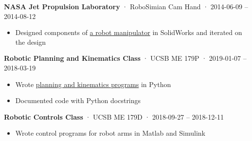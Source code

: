 \documentclass[12pt, oneside]{article}
\newcommand{\jobtitle}[3] {
	{\bf #1} · {#2} · {#3} \vspace{-7pt} \\
}
\begin{document}
\begin{flushleft}
\jobtitle{NASA Jet Propulsion Laboratory}{RoboSimian Cam Hand}{2014-06-09 – 2014-08-12}
\begin{itemize}
	\item Designed components of \href{https://portfolium.com/entry/rescue-robots}{a robot manipulator} in SolidWorks and iterated on the design
\end{itemize}

\jobtitle{Robotic Planning and Kinematics Class}{UCSB ME 179P}{2019-01-07 – 2018-03-19}
\begin{itemize}
	\item Wrote \href{https://github.com/fpdotmonkey/ME179P}{planning and kinematics programs} in Python
	\item Documented code with Python docstrings
\end{itemize}

\jobtitle{Robotic Controls Class}{UCSB ME 179D}{2018-09-27 – 2018-12-11}
\begin{itemize}
	\item Wrote control programs for robot arms in Matlab and Simulink
\end{itemize}





\end{flushleft}
\end{document}
